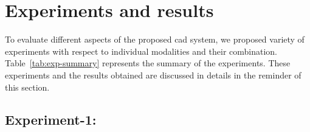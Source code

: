 \section{Experiments and results}\label{sec:chp6:exp-res}
To evaluate different aspects of the proposed \ac{cad} system, we proposed variety of experiments with respect to individual modalities and their combination. 
Table~\ref{tab:exp-summary} represents the summary of the experiments. 
These experiments and the results obtained are discussed in details in the reminder of this section. 

\subsection{Experiment-1:}\label{subec:chp6:exp-res:Ex1} 

\begin{figure}
  \hspace*{\fill}
  \hfill
  \hspace*{\fill} \\
  \hspace*{\fill}

\end{figure}
